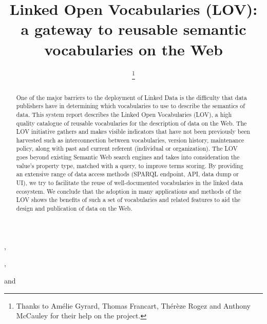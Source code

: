 \documentclass{iosart2c}
\begin{document}
\begin{frontmatter}                        %

%
\title{Linked Open Vocabularies (LOV): a gateway to reusable semantic vocabularies on the Web}




\author[A]{ \thanks{Thanks to Am\'elie Gyrard, Thomas Francart, Th\'er\`{e}ze Rogez and Anthony McCauley for their help on the project.}},
\author[B]{ },
\author[C]{ }
and
\author[D]{ }
\address[A]{Fujitsu (Ireland) Limited, Swords, Co. Dublin, Ireland\\
E-mail: pierre-yves.vandenbussche@ie.fujitsu.com}
\address[B]{Multimedia Communication Department, EURECOM, Campus SophiaTech
450, route des Chappes, 06410 Biot, France\\
E-mail: auguste.atemezing@eurecom.fr}
\address[C]{Ontology Engineering Group (OEG), 
Universidad Polit\'ecnica de Madrid, Madrid, Spain\\
E-mail: mpoveda@fi.upm.es}
\address[D]{Mondeca, 35 boulevard de Strasbourg, 75010 Paris, France
\\
E-mail: bernard.vatant@mondeca.com}


\begin{abstract}
One of the major barriers to the deployment of Linked Data is the difficulty that data publishers have in determining which vocabularies to use to describe the semantics of data. This system report describes the Linked Open Vocabularies (LOV), a high quality catalogue of reusable vocabularies for the description of data on the Web. The LOV initiative gathers and makes visible indicators that have not been previously been harvested such as interconnection between vocabularies, version history, maintenance policy, along with past and current referent (individual or organization). The LOV goes beyond existing Semantic Web search engines and takes into consideration the value's property type, matched with a query, to improve terms scoring. By providing an extensive range of data access methods (SPARQL endpoint, API, data dump or UI), we try to facilitate the reuse of well-documented vocabularies in the linked data ecosystem. We conclude that the adoption in many applications and methods of the LOV shows the benefits of such a set of vocabularies and related features to aid the design and publication of data on the Web.
\end{abstract}


\end{frontmatter}
\end{document}
